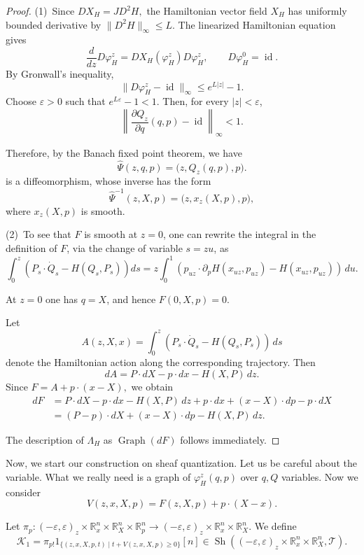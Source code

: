 \documentclass[11pt]{amsart}
\numberwithin{equation}{section}
\theoremstyle{plain}
\theoremstyle{definition}
\theoremstyle{remark}
\newcommand{\bR} { {\mathbb{R}}}
\newcommand{\cK} { {\mathcal{K}}}
\newcommand{\sT} { {\mathscr{T}}}
\newcommand{\Sh} { {\operatorname{Sh}}}
\begin{document}
\begin{proof}
(1)~Since
$
DX_H=JD^2H,
$
the Hamiltonian vector field $X_H$ has uniformly bounded derivative by $
\|D^2H\|_\infty\leq L
$. The linearized Hamiltonian equation gives
\[
\frac{d}{dz}D\varphi_H^z
=
DX_H(\varphi_H^z)D\varphi_H^z,
\qquad
D\varphi_H^0=\operatorname{id}.
\]
By Gronwall's inequality,
\[
\|D\varphi_H^z-\operatorname{id}\|_\infty
\leq
e^{L|z|}-1.
\]
Choose $\varepsilon>0$ such that
$
e^{L\varepsilon}-1<1.
$
Then, for every $|z|<\varepsilon$,
\[
\left\|
\frac{\partial Q_z}{\partial q}(q,p)
-\operatorname{id}
\right\|_\infty
<1.
\]

Therefore, by the Banach fixed point theorem, we have
\[
\widehat{\Psi}(z,q,p)
=
\bigl(z,Q_z(q,p),p\bigr).
\]
is a diffeomorphism, whose inverse has the form
\[
\widehat{\Psi}^{-1}(z,X,p)
=
\bigl(z,x_z(X,p),p\bigr),
\]
where $x_z(X,p)$ is smooth.

(2)~To see that $F$ is smooth at $z=0$, one can rewrite the integral in the definition of $F$, via the change of variable $s=zu$, as
\[
\int_0^z\left(P_s \cdot \dot{Q}_s - H(Q_s, P_s)\right) ds = z\int_0^1
\left(
p_{uz}\cdot
\partial_pH(x_{uz},p_{uz})
-
H(x_{uz},p_{uz})
\right)\,du.
\]

At $z=0$ one has $q=X$, and hence
$
F(0,X,p)=0.
$

Let
\[
A(z,X,x)
=
\int_0^z
\left(
P_s\cdot\dot Q_s-H(Q_s,P_s)
\right)\,ds
\]
denote the Hamiltonian action along the corresponding trajectory. Then
\[
dA
=
P\cdot dX
-
p\cdot dx
-
H(X,P)\,dz.
\]
Since
\(
F=A+p\cdot(x-X),
\) 
we obtain
\begin{align*}
dF
&=
P\cdot dX
-
p\cdot dx
-
H(X,P)\,dz
+
p\cdot dx
+
(x-X)\cdot dp
-
p\cdot dX \\
&=
(P-p)\cdot dX
+
(x-X)\cdot dp
-
H(X,P)\,dz.
\end{align*}

The description of $\Lambda_H$ as $\operatorname{Graph}(dF)$ follows
immediately.
\end{proof}

Now, we start our construction on sheaf quantization. Let us be careful about the variable. What we really need is a graph of $\varphi_H^z(q,p)$ over $q,Q$ variables. Now we consider
\[V(z,x,X,p)=F(z,X,p)+p\cdot (X-x).\]

Let 
\(\pi_{p}: (-\varepsilon,\varepsilon)_z\times \bR^n_x\times \bR^n_X\times \bR^n_p \to (-\varepsilon,\varepsilon)_z\times \bR^n_x\times \bR^n_X.\)
We define
\[\cK_1=\pi_{p!}1_{\{(z,x,X,p,t)\mid t+V(z,x,X,p)\geq 0\}}[n]\in \Sh((-\varepsilon,\varepsilon)_z\times \bR_x^n\times \bR^n_X,\sT).\]
\end{document}
